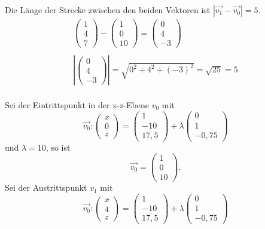 Die Länge der Strecke zwischen den beiden Vektoren ist $\displaystyle \left| \overrightarrow{v_{1}} -\overrightarrow{v_{0}}\right| =5$.
\begin{gather*}
	\begin{pmatrix}
		1\\
		4\\
		7
	\end{pmatrix} -\begin{pmatrix}
		1\\
		0\\
		10
	\end{pmatrix} =\begin{pmatrix}
		0\\
		4\\
		-3
	\end{pmatrix}\\
	\\
	\left| \begin{pmatrix}
		0\\
		4\\
		-3
	\end{pmatrix}\right| =\sqrt{0^{2} +4^{2} +( -3)^{2}} =\sqrt{25} =5
\end{gather*}
\\
Sei der Eintrittspunkt in der x-z-Ebene $\displaystyle v_{0}$ mit
\begin{equation*}
	\overrightarrow{v_{0}} :\begin{pmatrix}
		x\\
		0\\
		z
	\end{pmatrix} =\begin{pmatrix}
		1\\
		-10\\
		17,5
	\end{pmatrix} +\lambda \begin{pmatrix}
		0\\
		1\\
		-0,75
	\end{pmatrix}
\end{equation*}
und $\displaystyle \lambda =10$, so ist
\begin{equation*}
	\overrightarrow{v_{0}} =\begin{pmatrix}
		1\\
		0\\
		10
	\end{pmatrix}\text{.}
\end{equation*}
Sei der Austrittspunkt $\displaystyle v_{1}$ mit
\begin{equation*}
	\overrightarrow{v_{0}} :\begin{pmatrix}
		x\\
		4\\
		z
	\end{pmatrix} =\begin{pmatrix}
		1\\
		-10\\
		17,5
	\end{pmatrix} +\lambda \begin{pmatrix}
		0\\
		1\\
		-0,75
	\end{pmatrix}
\end{equation*}
